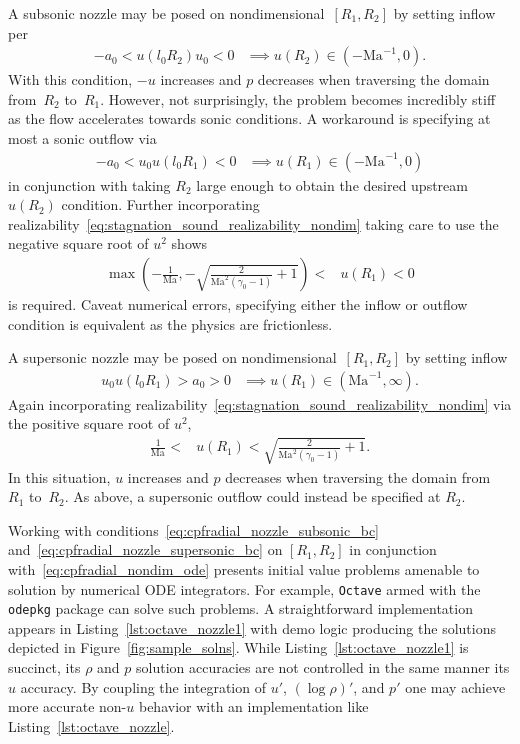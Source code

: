 \documentclass[letterpaper,11pt,nointlimits,reqno]{amsart}
\newcommand{\Mach}[1][]{\ensuremath{\mbox{Ma}_{#1}}}
\begin{document}
A subsonic nozzle may be posed on nondimensional~$\left[R_{1}, R_{2}\right]$ by
setting inflow per
\begin{align}
    -a_0 < u\!\left(l_0 R_{2}\right) u_0 < 0
    &\implies
    u\!\left(R_{2}\right) \in \left(-\Mach^{-1}, 0\right)
.
\end{align}
With this condition, $-u$ increases and $p$ decreases when traversing the
domain from~$R_{2}$ to~$R_{1}$.  However, not surprisingly, the problem becomes
incredibly stiff as the flow accelerates towards sonic conditions.  A
workaround is specifying at most a sonic outflow via
\begin{align}
    -a_0 < u_0 u\!\left(l_0 R_1\right) < 0
    &\implies
    u\!\left(R_1\right) \in \left(-\Mach^{-1}, 0\right)
\end{align}
in conjunction with taking $R_{2}$ large enough to obtain the desired upstream
$u\!\left(R_{2}\right)$ condition.  Further incorporating
realizability~\eqref{eq:stagnation_sound_realizability_nondim} taking care to
use the negative square root of $u^2$ shows
\begin{align}
  \max\left(
    -\frac{1}{\Mach}, -\sqrt{\frac{2}{\Mach^2\left(\gamma_0-1\right)}+1}
  \right) < &u\!\left(R_1\right) < 0
\label{eq:cpfradial_nozzle_subsonic_bc}
\end{align}
is required.  Caveat numerical errors, specifying either the inflow or outflow
condition is equivalent as the physics are frictionless.

A supersonic nozzle may be posed on nondimensional~$\left[R_{1}, R_{2}\right]$
by setting inflow
\begin{align}
   u_0 u\!\left(l_0 R_{1}\right) > a_0 > 0
   &\implies
   u\!\left(R_{1}\right) \in \left(\Mach^{-1}, \infty\right)
.
\end{align}
Again incorporating
realizability~\eqref{eq:stagnation_sound_realizability_nondim} via the positive
square root of $u^2$,
\begin{align}
  \frac{1}{\Mach} < &u\!\left(R_1\right)
  < \sqrt{\frac{2}{\Mach^2\left(\gamma_0-1\right)}+1}
\label{eq:cpfradial_nozzle_supersonic_bc}
.
\end{align}
In this situation, $u$ increases and $p$ decreases when traversing the domain
from~$R_{1}$ to~$R_{2}$.  As above, a supersonic outflow could instead be
specified at $R_{2}$.

Working with conditions~\eqref{eq:cpfradial_nozzle_subsonic_bc}
and~\eqref{eq:cpfradial_nozzle_supersonic_bc} on $\left[R_1, R_2\right]$ in
conjunction with~\eqref{eq:cpfradial_nondim_ode} presents initial value
problems amenable to solution by numerical ODE integrators.  For example,
\texttt{Octave}\citep{Eaton2008GNU} armed with the \texttt{odepkg} package can
solve such problems.  A straightforward implementation appears in
Listing~\ref{lst:octave_nozzle1} with demo logic producing the solutions
depicted in Figure~\ref{fig:sample_solns}.  While
Listing~\ref{lst:octave_nozzle1} is succinct, its $\rho$ and $p$ solution
accuracies are not controlled in the same manner its $u$ accuracy.  By coupling
the integration of $u'$, $\left(\log\rho\right)'$, and $p'$ one may achieve
more accurate non-$u$ behavior with an implementation like
Listing~\ref{lst:octave_nozzle}.
\end{document}
